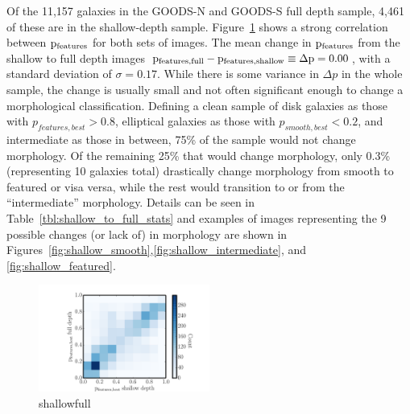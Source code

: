 \documentclass[twocolumn]{aastex6}
\begin{document}
Of the 11,157 galaxies in the GOODS-N and GOODS-S full depth sample, 4,461 of these are in the shallow-depth sample. Figure~\ref{fig:shallow_vs_full} shows a strong correlation between $\rm p_{features}$ for both sets of images. The mean change in $\rm p_{features}$ from the shallow to full depth images  $\rm p_{features,full} - p_{features,shallow} \equiv \Delta p = 0.00$, with a standard deviation of $\sigma = 0.17$. While there is some variance in $\Delta p$ in the whole sample, the change is usually small and not often significant enough to change a morphological classification. Defining a clean sample of disk galaxies as those with $p_{features,best}>0.8$, elliptical galaxies as those with  $p_{smooth,best}<0.2$, and intermediate as those in between, 75\% of the sample would not change morphology. Of the remaining 25\% that would change morphology, only 0.3\% (representing 10 galaxies total) drastically change morphology from smooth to featured or visa versa, while the rest would transition to or from the ``intermediate'' morphology. Details can be seen in Table~\ref{tbl:shallow_to_full_stats} and examples of images representing the 9 possible changes (or lack of) in morphology are shown in Figures~\ref{fig:shallow_smooth},\ref{fig:shallow_intermediate}, and \ref{fig:shallow_featured}.

\begin{figure}
\begin{center}
\includegraphics[width=0.50\textwidth]{figures/full_shallow_p_plot.pdf}
\caption{shallowfull}
\label{fig:shallow_vs_full}
\end{center}
\end{figure}
\end{document}
